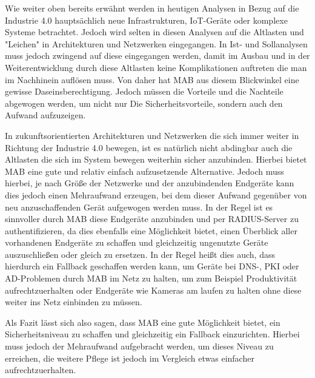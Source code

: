 \documentclass[conference]{IEEEtran}
\begin{document}
Wie weiter oben bereits erwähnt werden in heutigen Analysen in Bezug auf die Industrie 4.0 hauptsächlich neue Infrastrukturen, IoT-Geräte oder komplexe Systeme betrachtet. Jedoch wird selten in diesen Analysen auf die Altlasten und "Leichen" in Architekturen und Netzwerken eingegangen. In Ist- und Sollanalysen muss jedoch zwingend auf diese eingegangen werden, damit im Ausbau und in der Weiterentwicklung durch diese Altlasten keine Komplikationen auftreten die man im Nachhinein auflösen muss. Von daher hat MAB aus diesem Blickwinkel eine gewisse Daseinsberechtigung. Jedoch müssen die Vorteile und die Nachteile abgewogen werden, um nicht nur Die Sicherheitsvorteile, sondern auch den Aufwand aufzuzeigen.


In zukunftsorientierten Architekturen und Netzwerken die sich immer weiter in Richtung der Industrie 4.0 bewegen, ist es natürlich nicht abdingbar auch die Altlasten die sich im System bewegen weiterhin sicher anzubinden. Hierbei bietet MAB eine gute und relativ einfach aufzusetzende Alternative. Jedoch muss hierbei, je nach Größe der Netzwerke und der anzubindenden Endgeräte kann dies jedoch einen Mehraufwand erzeugen, bei dem dieser Aufwand gegenüber von neu anzuschaffenden Gerät aufgewogen werden muss. In der Regel ist es sinnvoller durch MAB diese Endgeräte anzubinden und per RADIUS-Server zu authentifizieren, da dies ebenfalls eine Möglichkeit bietet, einen Überblick aller vorhandenen Endgeräte zu schaffen und gleichzeitig ungenutzte Geräte auszuschließen oder gleich zu ersetzen. In der Regel heißt dies auch, dass hierdurch ein Fallback geschaffen werden kann, um Geräte bei DNS-, PKI oder AD-Problemen durch MAB im Netz zu halten, um zum Beispiel Produktivität aufrechtzuerhalten oder Endgeräte wie Kameras am laufen zu halten ohne diese weiter ins Netz einbinden zu müssen.


Als Fazit lässt sich also sagen, dass MAB eine gute Möglichkeit bietet, ein Sicherheitsniveau zu schaffen und gleichzeitig ein Fallback einzurichten. Hierbei muss jedoch der Mehraufwand aufgebracht werden, um dieses Niveau zu erreichen, die weitere Pflege ist jedoch im Vergleich etwas einfacher aufrechtzuerhalten.
%




\end{document}

